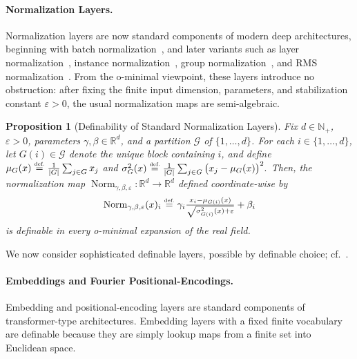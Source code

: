 \documentclass{article}
\newcommand{\eqdef}{\ensuremath{\stackrel{\mbox{\upshape\tiny def.}}{=}}}
\theoremstyle{plain}
\newtheorem{proposition}[theorem]{Proposition}
\theoremstyle{definition}
\theoremstyle{remark}
\theoremstyle{plain}
\numberwithin{thm}{section}
\theoremstyle{definition}
\numberwithin{equation}{section}
\begin{document}
\paragraph{Normalization Layers.}

Normalization layers are now standard components of modern deep architectures, beginning with batch normalization~\citep{ioffe2015batch}, and later variants such as layer normalization~\citep{ba2016layer}, instance normalization~\citep{ulyanov2016instance}, group normalization~\citep{wu2018group}, and RMS normalization~\citep{zhang2019root}.  From the o-minimal viewpoint, these layers introduce no obstruction: after fixing the finite input dimension, parameters, and stabilization constant $\varepsilon>0$, the usual normalization maps are semi-algebraic.

\begin{proposition}[Definability of Standard Normalization Layers]
\label{prop:normalization_layers_definable}
Fix $d\in\mathbb{N}_+$, $\varepsilon>0$, parameters $\gamma,\beta\in\mathbb{R}^d$, and a partition $\mathcal{G}$ of $\{1,\dots,d\}$.  For each $i\in\{1,\dots,d\}$, let $G(i)\in\mathcal{G}$ denote the unique block containing $i$, and define
$
    \mu_G(x)
    \eqdef
        \frac{1}{|G|}
        \sum_{j\in G}x_j
$ and $
    \sigma_G^2(x)
    \eqdef
        \frac{1}{|G|}
        \sum_{j\in G}\big(x_j-\mu_G(x)\big)^2 
.
$
Then, the normalization map $\operatorname{Norm}_{\gamma,\beta,\varepsilon}:\mathbb{R}^d\to\mathbb{R}^d$ defined coordinate-wise by
\[
\operatorname{Norm}_{\gamma,\beta,\varepsilon}(x)_i
    \eqdef
        \gamma_i
        \tfrac{x_i-\mu_{G(i)}(x)}     {\sqrt{\sigma_{G(i)}^2(x)+\varepsilon}}
        +\beta_i
\]
is definable in every o-minimal expansion of the real field.
\end{proposition}

We now consider sophisticated definable layers, possible by definable choice; cf.~\cite[Theorem 3.1]{coste1999introduction}.

\paragraph{Embeddings and Fourier Positional-Encodings.}

Embedding and positional-encoding layers are standard components of transformer-type architectures. Embedding layers with a fixed finite vocabulary are definable because they are
simply lookup maps from a finite set into Euclidean space.
\end{document}
